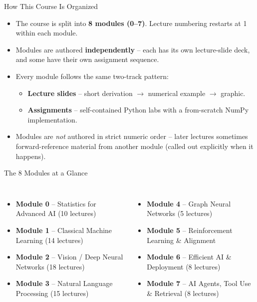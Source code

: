 \begin{frame}{How This Course Is Organized}
\begin{itemize}
  \item The course is split into \textbf{8 modules (0--7)}. Lecture numbering restarts at 1 within each module.
  \pause
  \item Modules are authored \textbf{independently} -- each has its own lecture-slide deck, and some have their own assignment sequence.
  \pause
  \item Every module follows the same two-track pattern:
  \begin{itemize}
    \item \textbf{Lecture slides} -- short derivation $\rightarrow$ numerical example $\rightarrow$ graphic.
    \item \textbf{Assignments} -- self-contained Python labs with a from-scratch NumPy implementation.
  \end{itemize}
  \pause
  \item Modules are \emph{not} authored in strict numeric order -- later lectures sometimes forward-reference material from another module (called out explicitly when it happens).
\end{itemize}
\end{frame}

\begin{frame}{The 8 Modules at a Glance}
\small
\begin{columns}[T]
\begin{itemize}
  \item \textbf{Module 0} -- Statistics for Advanced AI (10 lectures)
  \pause
  \item \textbf{Module 1} -- Classical Machine Learning (14 lectures)
  \pause
  \item \textbf{Module 2} -- Vision / Deep Neural Networks (18 lectures)
  \pause
  \item \textbf{Module 3} -- Natural Language Processing (15 lectures)
\end{itemize}
\pause
{}
\begin{itemize}
  \item \textbf{Module 4} -- Graph Neural Networks (5 lectures)
  \pause
  \item \textbf{Module 5} -- Reinforcement Learning \& Alignment
  \pause
  \item \textbf{Module 6} -- Efficient AI \& Deployment (8 lectures)
  \pause
  \item \textbf{Module 7} -- AI Agents, Tool Use \& Retrieval (8 lectures)
\end{itemize}
\end{columns}
\end{frame}


